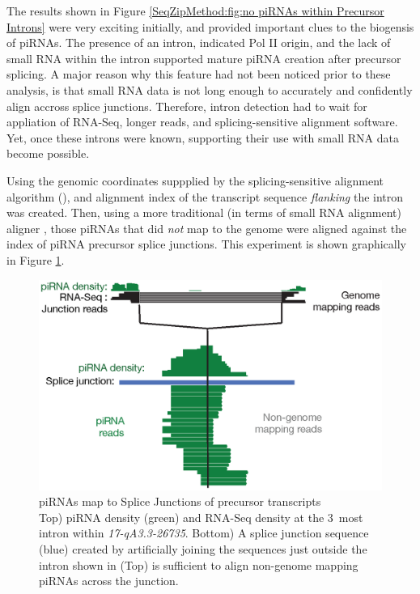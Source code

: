   The results shown in Figure \ref{SeqZipMethod:fig:no piRNAs within Precursor Introns} were very exciting initially, and provided important clues to the biogensis of piRNAs. The presence of an intron, indicated Pol II origin, and the lack of small RNA within the intron supported mature piRNA creation after precursor splicing. A major reason why this feature had not been noticed prior to these analysis, is that small RNA data is not long enough to accurately and confidently align accross splice junctions. Therefore, intron detection had to wait for appliation of RNA-Seq, longer reads, and splicing-sensitive alignment software. Yet, once these introns were known, supporting their use with small RNA data become possible.

  Using the genomic coordinates suppplied by the splicing-sensitive alignment algorithm (\citep{Trapnell2009}), and alignment index of the transcript sequence \textit{flanking} the intron was created. Then, using a more traditional (in terms of small RNA alignment) aligner \citep{Langmead2009}, those piRNAs that did \textit{not} map to the genome were aligned against the index of piRNA precursor splice junctions. This experiment is shown graphically in Figure \ref{SeqZipMethod:fig: piRNAs map to SJ}.

  \begin{figure} %
    \centering 
    \includegraphics{Figures/SeqZipMethod/smallRNAsMapToPrecursorSJ.eps}
    \caption[piRNAs map to Splice Junctions of precursor transcripts]
    {
      piRNAs map to Splice Junctions of precursor transcripts\\[0.25cm]
      Top) piRNA density (green) and RNA-Seq density at the 3\textprime~most intron within \textit{17-qA3.3-26735}. Bottom) A splice junction sequence (blue) created by artificially joining the sequences just outside the intron shown in (Top) is sufficient to align non-genome mapping piRNAs across the junction.
      }
    \label{SeqZipMethod:fig: piRNAs map to SJ}
    \end{figure}

